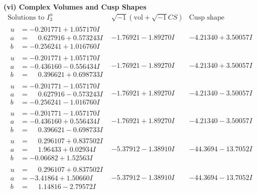 \documentclass[1p]{elsarticle_modified}
\theoremstyle{definition}
\newcommand{\I}{\sqrt{-1}}
\begin{document}
\newpage\flushleft \textbf{(vi) Complex Volumes and Cusp Shapes}
$$\begin{array}{c|c|c}  
\text{Solutions to }I^u_{3}& \I (\text{vol} + \sqrt{-1}CS) & \text{Cusp shape}\\
 \hline 
\begin{aligned}
u &= -0.201771 + 1.057170 I \\
a &= \phantom{-}0.627916 + 0.573243 I \\
b &= -0.256241 + 1.016760 I\end{aligned}
 & -1.76921 - 1.89270 I & -4.21340 + 3.50057 I \\ \hline\begin{aligned}
u &= -0.201771 + 1.057170 I \\
a &= -0.436160 - 0.556434 I \\
b &= \phantom{-}0.396621 + 0.698733 I\end{aligned}
 & -1.76921 - 1.89270 I & -4.21340 + 3.50057 I \\ \hline\begin{aligned}
u &= -0.201771 - 1.057170 I \\
a &= \phantom{-}0.627916 - 0.573243 I \\
b &= -0.256241 - 1.016760 I\end{aligned}
 & -1.76921 + 1.89270 I & -4.21340 - 3.50057 I \\ \hline\begin{aligned}
u &= -0.201771 - 1.057170 I \\
a &= -0.436160 + 0.556434 I \\
b &= \phantom{-}0.396621 - 0.698733 I\end{aligned}
 & -1.76921 + 1.89270 I & -4.21340 - 3.50057 I \\ \hline\begin{aligned}
u &= \phantom{-}0.296107 + 0.837502 I \\
a &= \phantom{-}1.96433 + 0.02934 I \\
b &= -0.06682 + 1.52563 I\end{aligned}
 & -5.37912 - 1.38910 I & -44.3694 - 13.7052 I \\ \hline\begin{aligned}
u &= \phantom{-}0.296107 + 0.837502 I \\
a &= -3.41864 + 1.50660 I \\
b &= \phantom{-}1.14816 - 2.79572 I\end{aligned}
 & -5.37912 - 1.38910 I & -44.3694 - 13.7052 I \\ \hline\begin{aligned}

\end{aligned}
\end{array}$$
\end{document}
